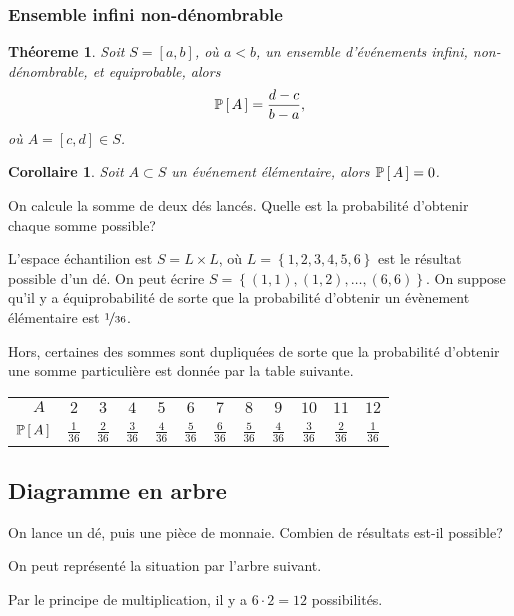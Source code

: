 \documentclass[11pt]{article}
\renewcommand\P[1]{%
	\ensuremath{%
		\mathbb{P}\left[\,#1\,\right]%
	}%
}%
\newtheorem{theoreme}{Théoreme}[section]
\newtheorem*{corollary}{Corollaire}
\theoremstyle{remark}
\theoremstyle{definition}
\begin{document}
\subsubsection{Ensemble infini non-dénombrable}
\begin{theoreme}
	Soit $S=\left[a,b\right]$, où $a<b$, un ensemble d'événements infini,
	non-dénombrable, et equiprobable, alors
	\begin{equation*}
		\P{A}=\frac{d-c}{b-a},
	\end{equation*}
	où $A=\left[c,d\right]\in S$.
\end{theoreme}

\begin{corollary}
	Soit $A\subset S$ un événement élémentaire, alors $\P{A}=0$.
\end{corollary}

\begin{exemple}
	On calcule la somme de deux dés lancés. Quelle est la probabilité d'obtenir
	chaque somme possible?
	
	L'espace échantilion est $S=L\times L$, où $L=\left\{1,2,3,4,5,6\right\}$
	est le résultat possible d'un dé. On peut écrire
	$S=\left\{(1,1),(1,2),\dots,(6,6)\right\}$. On suppose qu'il y a
	équiprobabilité de sorte que la probabilité d'obtenir un évènement
	élémentaire est $\nicefrac{1}{36}$.

	Hors, certaines des sommes sont dupliquées de sorte que la probabilité
	d'obtenir une somme particulière est donnée par la table suivante.
	\begin{table}[H]
		\centering
		\begin{tabular}{r|ccccccccccc}
			$\phantom{\mathbb{P}(}A\phantom{)}$ &
			$2$ & $3$ & $4$ & $5$ & $6$ & $7$ & $8$ & $9$ & $10$ & $11$ & $12$\\
			$\P{A}$ &
			$\frac{1}{36}$ & $\frac{2}{36}$ & $\frac{3}{36}$ & $\frac{4}{36}$ &
			$\frac{5}{36}$ & $\frac{6}{36}$ & $\frac{5}{36}$ & $\frac{4}{36}$ &
			$\frac{3}{36}$ & $\frac{2}{36}$ & $\frac{1}{36}$\\
		\end{tabular}
	\end{table}
\end{exemple}

\subsection{Diagramme en arbre}
\begin{exemple}
	On lance un dé, puis une pièce de monnaie. Combien de résultats est-il
	possible?
	
	On peut représenté la situation par l'arbre suivant.
	\begin{figure}[H]
		\centering
		
	\end{figure}
	Par le principe de multiplication, il y a $6\cdot 2=12$ possibilités.
\end{exemple}
\end{document}
